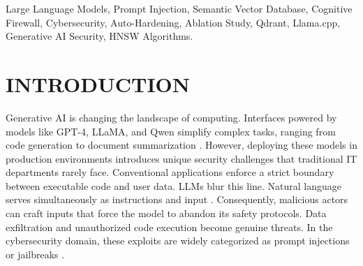 \documentclass[10pt, conference]{IEEEtran}
\begin{document}
\begin{abstract}
The integration of Large Language Models (LLMs) into modern software architectures is accelerating rapidly. Yet, this aggressive adoption uncovers a critical vulnerability—prompt injection. Traditional firewalls, which lean heavily on static keyword filtering, frequently fail. Attackers routinely bypass them using encoding tricks or multi-turn conversational setups. To address this gap, we present a multi-tier, stateful firewall tailored for LLM deployment. The defensive workload is split across multiple layers. Layer 1 operates as a high-speed semantic filter. By leveraging a Qdrant vector database alongside SentenceTransformers, it intercepts roughly 95\% of known attack vectors in under 25 milliseconds. The second layer, a deep cognitive evaluator, utilizes a local Qwen LLM via Llama.cpp on consumer-grade hardware. Only the remaining 5\% of anomalous traffic reaches this heavier layer for deeper intent analysis. A core innovation of our architecture is its autonomous learning capability, which feeds zero-day exploits caught by Layer 2 directly into Layer 1's vector index. We evaluated this system against a rigorous 80,000-prompt dataset. Baseline comparisons and ablation studies demonstrate that while no system is perfectly secure, this combined architecture significantly outperforms standalone semantic or cognitive filters, achieving a 99.8\% true-positive block rate on unseen test data while maintaining an average system latency of approximately 55 milliseconds. Extensive profiling further proves the hardware efficiency and scalability of this decoupled approach for enterprise AI.
\end{abstract}

\begin{IEEEkeywords}
Large Language Models, Prompt Injection, Semantic Vector Database, Cognitive Firewall, Cybersecurity, Auto-Hardening, Ablation Study, Qdrant, Llama.cpp, Generative AI Security, HNSW Algorithms.
\end{IEEEkeywords}

\section{INTRODUCTION}
Generative AI is changing the landscape of computing. Interfaces powered by models like GPT-4, LLaMA, and Qwen simplify complex tasks, ranging from code generation to document summarization \cite{vaswani2017attention, touvron2023llama, bai2023qwen}. However, deploying these models in production environments introduces unique security challenges that traditional IT departments rarely face. Conventional applications enforce a strict boundary between executable code and user data. LLMs blur this line. Natural language serves simultaneously as instructions and input \cite{greshake2023not}. Consequently, malicious actors can craft inputs that force the model to abandon its safety protocols. Data exfiltration and unauthorized code execution become genuine threats. In the cybersecurity domain, these exploits are widely categorized as prompt injections or jailbreaks \cite{liu2023jailbreaking, wei2023jailbroken}.
\end{document}

